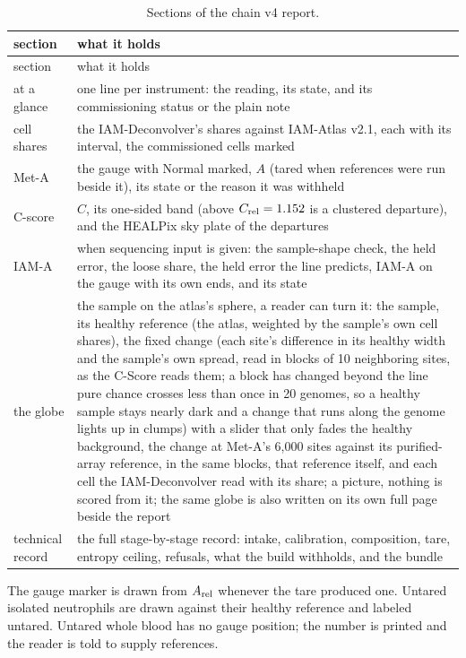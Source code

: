 \begin{center}\small
\begin{longtable}{@{}p{}p{}@{}}
\caption{Sections of the chain v4 report.}\label{tab:tabs}\\
\toprule section & what it holds \\\midrule\endfirsthead
\toprule section & what it holds \\\midrule\endhead
at a glance & one line per instrument: the reading, its state, and its commissioning status or the plain note \\
cell shares & the IAM-Deconvolver's shares against IAM-Atlas v2.1, each with its interval, the commissioned cells marked \\
Met-A & the gauge with Normal marked, $A$ (tared when references were run beside it), its state or the reason it was withheld \\
C-score & $C$, its one-sided band (above $C_{\rm rel}=1.152$ is a clustered departure), and the HEALPix sky plate of the departures \\
IAM-A & when sequencing input is given: the sample-shape check, the held error, the loose share, the held error the line predicts, IAM-A on the gauge with its own ends, and its state \\
the globe & the sample on the atlas's sphere, a reader can turn it: the sample, its healthy reference (the atlas, weighted by the sample's own cell shares), the fixed change (each site's difference in its healthy width and the sample's own spread, read in blocks of 10 neighboring sites, as the C-Score reads them; a block has changed beyond the line pure chance crosses less than once in 20 genomes, so a healthy sample stays nearly dark and a change that runs along the genome lights up in clumps) with a slider that only fades the healthy background, the change at Met-A's 6,000 sites against its purified-array reference, in the same blocks, that reference itself, and each cell the IAM-Deconvolver read with its share; a picture, nothing is scored from it; the same globe is also written on its own full page beside the report \\
technical record & the full stage-by-stage record: intake, calibration, composition, tare, entropy ceiling, refusals, what the build withholds, and the bundle \\\bottomrule
\end{longtable}
\end{center}

The gauge marker is drawn from $A_{\rm rel}$ whenever the tare produced one. Untared isolated neutrophils are drawn against their healthy reference and labeled untared.
Untared whole blood has no gauge position; the number is printed and the reader is told to supply references.

